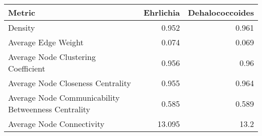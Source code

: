 \begin{center}
    \begin{tabular}{l|r r}
        Metric & Ehrlichia & Dehalococcoides\\
        \hline
        Density & 0.952&0.961\\
        Average Edge Weight & 0.074&0.069\\
        Average Node Clustering Coefficient & 0.956&0.96\\
        Average Node Closeness Centrality & 0.955&0.964\\
        Average Node Communicability Betweenness Centrality & 0.585 &0.589\\
        Average Node Connectivity & 13.095 & 13.2\\
    \end{tabular}
\end{center}
